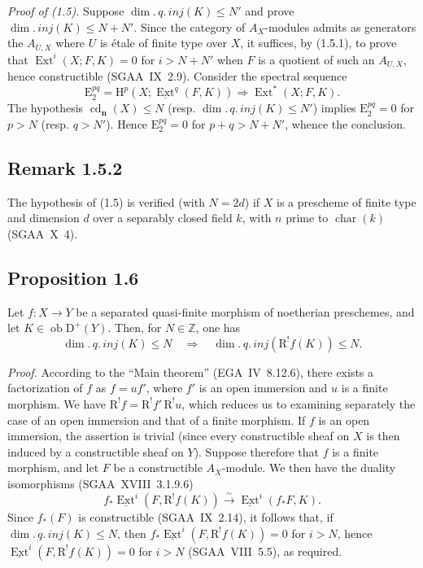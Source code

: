 \documentclass[11pt]{article}
\renewcommand{\H}{\mathrm{H}}
\DeclareMathOperator{\Ext}{Ext}
\DeclareMathOperator{\cd}{cd}
\newcommand{\R}{\mathrm{R}}
\newcommand{\D}{\mathrm{D}}
\newcommand{\Z}{\mathbb{Z}}
\newcommand{\E}{\mathrm{E}}
\newcommand{\ob}{\operatorname{ob}}
\newcommand{\charac}{\operatorname{char}}
\begin{document}
\emph{Proof of (1.5).} Suppose $\dim.\,q.\,inj(K) \leqslant N'$ and prove $\dim.\,inj(K) \leqslant N + N'$. Since the category of $A_X$-modules admits as generators the $A_{U,X}$ where $U$ is étale of finite type over $X$, it suffices, by (1.5.1), to prove that $\Ext^i(X; F,K) = 0$ for $i > N + N'$ when $F$ is a quotient of such an $A_{U,X}$, hence constructible (SGAA~IX~2.9). Consider the spectral sequence
\[
\E_2^{pq} = \H^p(X; \underline{\Ext}^q(F,K)) \Rightarrow \Ext^{*}(X; F,K).
\]
The hypothesis $\cd_{\mathbf{n}}(X) \leqslant N$ (resp. $\dim.\,q.\,inj(K) \leqslant N'$) implies $\E_2^{pq} = 0$ for $p > N$ (resp. $q > N'$). Hence $\E_2^{pq} = 0$ for $p+q > N+N'$, whence the conclusion.

\subsection*{Remark 1.5.2}
The hypothesis of (1.5) is verified (with $N = 2d$) if $X$ is a prescheme of finite type and dimension $d$ over a separably closed field $k$, with $n$ prime to $\charac(k)$ (SGAA~X~4).

\subsection*{Proposition 1.6}
Let $f : X \to Y$ be a separated quasi-finite morphism of noetherian preschemes, and let $K \in \ob \D^{+}(Y)$. Then, for $N \in \Z$, one has
\[
\dim.\,q.\,inj(K) \leqslant N \quad \Longrightarrow \quad \dim.\,q.\,inj(\R^{!}f(K)) \leqslant N.
\]

\emph{Proof.} According to the ``Main theorem'' (EGA~IV~8.12.6), there exists a factorization of $f$ as $f = uf'$, where $f'$ is an open immersion and $u$ is a finite morphism. We have $\R^{!}f = \R^{!}f' \, \R^{!}u$, which reduces us to examining separately the case of an open immersion and that of a finite morphism. If $f$ is an open immersion, the assertion is trivial (since every constructible sheaf on $X$ is then induced by a constructible sheaf on $Y$). Suppose therefore that $f$ is a finite morphism, and let $F$ be a constructible $A_X$-module. We then have the duality isomorphisms (SGAA~XVIII~3.1.9.6)
\[
f_{*}\underline{\Ext}^i(F, \R^{!}f(K)) \xrightarrow{\sim} \underline{\Ext}^i(f_{*}F, K).
\]
Since $f_{*}(F)$ is constructible (SGAA~IX~2.14), it follows that, if $\dim.\,q.\,inj(K) \leqslant N$, then $f_{*}\underline{\Ext}^i(F, \R^{!}f(K)) = 0$ for $i > N$, hence $\underline{\Ext}^i(F, \R^{!}f(K)) = 0$ for $i > N$ (SGAA~VIII~5.5), as required.
\end{document}
